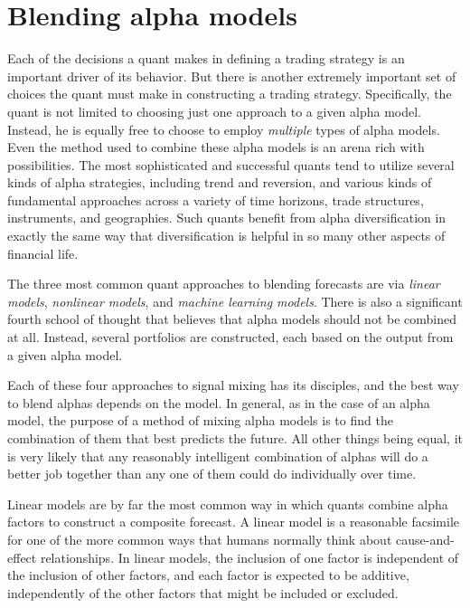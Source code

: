 \documentclass[11pt]{report}
\begin{document}
		\section{Blending alpha models}

			Each of the decisions a quant makes in defining a trading strategy is an important driver of its behavior. But there is another extremely important set of choices the quant must make in constructing a trading strategy. Specifically, the quant is not limited to choosing just one approach to a given alpha model. Instead, he is equally free to choose to employ \textit{multiple} types of alpha models. Even the method used to combine these alpha models is an arena rich with possibilities. The most sophisticated and successful quants tend to utilize several kinds of alpha strategies, including trend and reversion, and various kinds of fundamental approaches across a variety of time horizons, trade structures, instruments, and geographies. Such quants benefit from alpha diversification in exactly the same way that diversification is helpful in so many other aspects of financial life.

			The three most common quant approaches to blending forecasts are via \textit{linear models}, \textit{nonlinear models}, and \textit{machine learning models}. There is also a significant fourth school of thought that believes that alpha models should not be combined at all. Instead, several portfolios are constructed, each based on the output from a given alpha model. 

			Each of these four approaches to signal mixing has its disciples, and the best way to blend alphas depends on the model. In general, as in the case of an alpha model, the purpose of a method of mixing alpha models is to find the combination of them that best predicts the future. All other things being equal, it is very likely that any reasonably intelligent combination of alphas will do a better job together than any one of them could do individually over time. 

			Linear models are by far the most common way in which quants combine alpha factors to construct a composite forecast. A linear model is a reasonable facsimile for one of the more common ways that humans normally think about cause-and-effect relationships. In linear models, the inclusion of one factor is independent of the inclusion of other factors, and each factor is expected to be additive, independently of the other factors that might be included or excluded.
\end{document}
